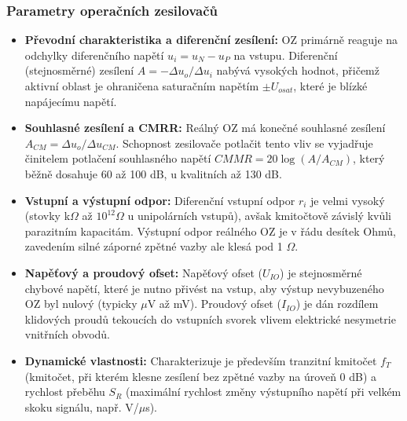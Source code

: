     \subsubsection{Parametry operačních zesilovačů}
        \begin{itemize}
            \item \textbf{Převodní charakteristika a diferenční zesílení:} OZ primárně reaguje na odchylky diferenčního napětí $u_i = u_N - u_P$ na vstupu. Diferenční (stejnosměrné) zesílení $A = -\Delta u_o / \Delta u_i$ nabývá vysokých hodnot, přičemž aktivní oblast je ohraničena saturačním napětím $\pm U_{osat}$, které je blízké napájecímu napětí.
            \item \textbf{Souhlasné zesílení a CMRR:} Reálný OZ má  konečné souhlasné zesílení $A_{CM} = \Delta u_o / \Delta u_{CM}$. Schopnost zesilovače potlačit tento vliv se vyjadřuje činitelem potlačení souhlasného napětí $CMMR = 20 \log(A / A_{CM})$, který běžně dosahuje 60 až 100 dB, u kvalitních až 130 dB.
            \item \textbf{Vstupní a výstupní odpor:} Diferenční vstupní odpor $r_i$ je velmi vysoký (stovky k$\Omega$ až $10^{12} \Omega$ u unipolárních vstupů), avšak kmitočtově závislý kvůli parazitním kapacitám. Výstupní odpor reálného OZ je v řádu desítek Ohmů, zavedením silné záporné zpětné vazby ale klesá pod 1 $\Omega$.
            \item \textbf{Napěťový a proudový ofset:} Napěťový ofset ($U_{IO}$) je stejnosměrné chybové napětí, které je nutno přivést na vstup, aby výstup nevybuzeného OZ byl nulový (typicky $\mu$V až mV). Proudový ofset ($I_{IO}$) je dán rozdílem klidových proudů tekoucích do vstupních svorek vlivem elektrické nesymetrie vnitřních obvodů.
            \item \textbf{Dynamické vlastnosti:} Charakterizuje je především tranzitní kmitočet $f_T$ (kmitočet, při kterém klesne zesílení bez zpětné vazby na úroveň 0 dB) a rychlost přeběhu $S_R$ (maximální rychlost změny výstupního napětí při velkém skoku signálu, např. V/$\mu$s).
        \end{itemize}

